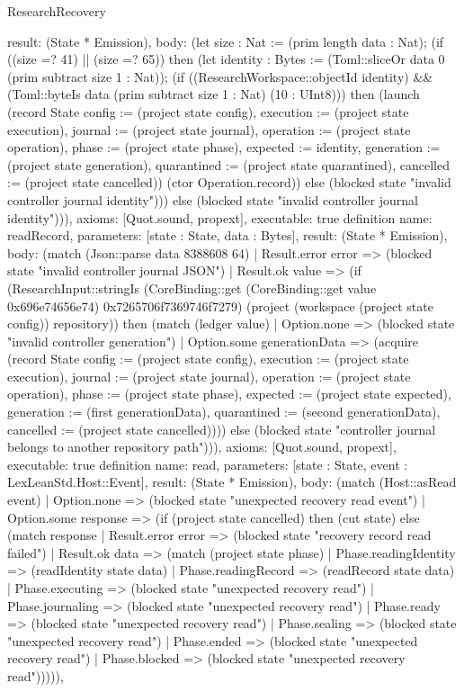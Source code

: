 \begin{lexlean}{ResearchRecovery}
\begin{semanticmodule}
{ result: (State * Emission),
 body: (let size : Nat := (prim length data : Nat); (if ((size =? 41) || (size =? 65)) then (let identity : Bytes := (Toml::sliceOr data 0 (prim subtract size 1 : Nat)); (if ((ResearchWorkspace::objectId identity) && (Toml::byteIs data (prim subtract size 1 : Nat) (10 : UInt8))) then (launch (record State {config := (project state config), execution := (project state execution), journal := (project state journal), operation := (project state operation), phase := (project state phase), expected := identity, generation := (project state generation), quarantined := (project state quarantined), cancelled := (project state cancelled)}) (ctor Operation.record)) else (blocked state "invalid controller journal identity"))) else (blocked state "invalid controller journal identity"))),
 axioms: [Quot.sound, propext],
 executable: true
}
definition{
 name: readRecord,
 parameters: [state : State, data : Bytes],
 result: (State * Emission),
 body: (match (Json::parse data 8388608 64) | Result.error error => (blocked state "invalid controller journal JSON") | Result.ok value => (if (ResearchInput::stringIs (CoreBinding::get (CoreBinding::get value 0x696e74656e74) 0x7265706f7369746f7279) (project (workspace (project state config)) repository)) then (match (ledger value) | Option.none => (blocked state "invalid controller generation") | Option.some generationData => (acquire (record State {config := (project state config), execution := (project state execution), journal := (project state journal), operation := (project state operation), phase := (project state phase), expected := (project state expected), generation := (first generationData), quarantined := (second generationData), cancelled := (project state cancelled)}))) else (blocked state "controller journal belongs to another repository path"))),
 axioms: [Quot.sound, propext],
 executable: true
}
definition{
 name: read,
 parameters: [state : State, event : LexLeanStd.Host::Event],
 result: (State * Emission),
 body: (match (Host::asRead event) | Option.none => (blocked state "unexpected recovery read event") | Option.some response => (if (project state cancelled) then (cut state) else (match response | Result.error error => (blocked state "recovery record read failed") | Result.ok data => (match (project state phase) | Phase.readingIdentity => (readIdentity state data) | Phase.readingRecord => (readRecord state data) | Phase.executing => (blocked state "unexpected recovery read") | Phase.journaling => (blocked state "unexpected recovery read") | Phase.ready => (blocked state "unexpected recovery read") | Phase.sealing => (blocked state "unexpected recovery read") | Phase.ended => (blocked state "unexpected recovery read") | Phase.blocked => (blocked state "unexpected recovery read"))))),
}
\end{semanticmodule}
\end{lexlean}
